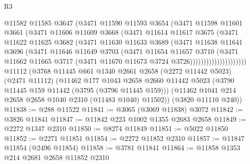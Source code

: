 \begin{lexlean}{R3}
\begin{coremodule}
                        @11582
                        @11585
                        @3647
                        (@3471
                          @11590
                          @11593
                          @3654
                          (@3471
                            @11598
                            @11601
                            @3661
                            (@3471
                              @11606
                              @11609
                              @3668
                              (@3471
                                @11614
                                @11617
                                @3675
                                (@3471
                                  @11622
                                  @11625
                                  @3682
                                  (@3471
                                    @11630
                                    @11633
                                    @3689
                                    (@3471
                                      @11638
                                      @11641
                                      @3696
                                      (@3471
                                        @11646
                                        @11649
                                        @3703
                                        (@3471
                                          @11654
                                          @11657
                                          @3710
                                          (@3471
                                            @11662
                                            @11665
                                            @3717
                                            (@3471 @11670 @11673 @3724 @3726)))))))))))))))))))))
    @11112
    (@3768
      @11445
      @661
      @1340
      @2661
      @2658
      (@2272 @11442 @5023)
      (@2471 @11112)
      (@11462
        @177
        @1043
        @2658
        @2660
        @11442
        @5023
        (@3790 @11445 @159 @11442 (@3795 (@3796 @11445 @159)))
        (@11462 @1041 @214 @2658 @2658 @1040 @2310 (@11483 @1040) @11502))
      (@3820 @11110 @240))
@11838 := @288 @11522
@11841 := @3065 (@3069 @11838) @3072
@11842 := @3826 @11841
@11847 := @11842 @223 @1002 @1355 @2683 @2658
@11849 := @2272 @1347 @2310
@11850 := @8274 @11849
@11851 := @5022 @11850
@11852 := @2271 @11851
@11854 := @2272 @11852 @2310
@11857 := @11847 @11854 (@2496 @11854)
@11858 := @3781 @11841
@11864 := @11858 @1353 @214 @2681 @2658 @11852 @2310

\end{coremodule}
\end{lexlean}
